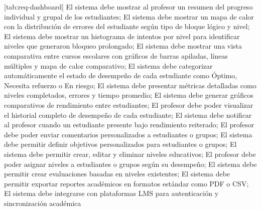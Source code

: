 [tab:req-dashboard]{
	El sistema debe mostrar al profesor un resumen del progreso individual y grupal de los estudiantes;
	El sistema debe mostrar un mapa de calor con la distribución de errores del estudiante según tipo de bloque lógico y nivel;
	El sistema debe mostrar un histograma de intentos por nivel para identificar niveles que generaron bloqueo prolongado;
	El sistema debe mostrar una vista comparativa entre cursos escolares con gráficos de barras apiladas, líneas múltiples y mapa de calor comparativo;
	El sistema debe categorizar automáticamente el estado de desempeño de cada estudiante como Óptimo, Necesita refuerzo o En riesgo;
	El sistema debe presentar métricas detalladas como niveles completados, errores y tiempo promedio;
	El sistema debe generar gráficos comparativos de rendimiento entre estudiantes;
	El profesor debe poder visualizar el historial completo de desempeño de cada estudiante;
	El sistema debe notificar al profesor cuando un estudiante presente bajo rendimiento reiterado;
	El profesor debe poder enviar comentarios personalizados a estudiantes o grupos;
	El sistema debe permitir definir objetivos personalizados para estudiantes o grupos;
	El sistema debe permitir crear, editar y eliminar niveles educativos;
	El profesor debe poder asignar niveles a estudiantes o grupos según su desempeño;
	El sistema debe permitir crear evaluaciones basadas en niveles existentes;
	El sistema debe permitir exportar reportes académicos en formatos estándar como PDF o CSV;
	El sistema debe integrarse con plataformas LMS para autenticación y sincronización académica
}


